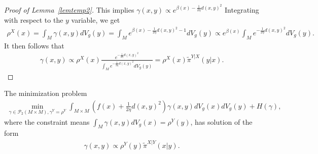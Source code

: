 \begin{proof}[Proof of Lemma~\ref{lemtemp2}]
    This implies $\gamma(x, y) \propto e^{\beta(x) - \frac{1}{2\eta} d(x, y)^{2}}$
    Integrating with respect to the $y$ variable, we get 
    \begin{align*}
        \rho^{X}(x) = \int_{M} \gamma(x, y) dV_{g}(y) = \int_{M} e^{\beta(x) - \frac{1}{2\eta} d(x, y)^{2} - 1} dV_{g}(y) \propto e^{\beta(x) } \int_{M} e^{ - \frac{1}{2\eta} d(x, y)^{2}} dV_{g}(y).
    \end{align*}
    It then follows that 
    \begin{align*}
        \gamma(x, y) \propto \rho^{X}(x) \frac{e^{- \frac{1}{2\eta} d(x, y)^{2}}}{\int_{M} e^{ - \frac{1}{2\eta} d(x, y)^{2}} dV_{g}(y)}
        = \rho^{X}(x) \tilde{\pi}^{Y|X}(y|x).
    \end{align*}
\end{proof}

\begin{lemma}\label{lemtemp3}
    The minimization problem 
    \begin{align*}
        \min_{
            \gamma \in \mathcal{P}_{2}(M \times M),
            \gamma^{Y} = \rho^{Y}
        } \int_{M \times M} (f(x) + \frac{1}{2\eta} d(x, y)^{2}) \gamma (x, y) dV_{g}(x) dV_{g}(y) 
        + H(\gamma),
    \end{align*}
    where the constraint means $\int_{M} \gamma(x, y) dV_{g}(x) = \rho^{Y}(y)$, 
    has solution of the form 
    \begin{align*}
        \gamma(x, y) \propto \rho^{Y}(y) \tilde{\pi}^{X|Y}(x|y).
    \end{align*}
\end{lemma}

